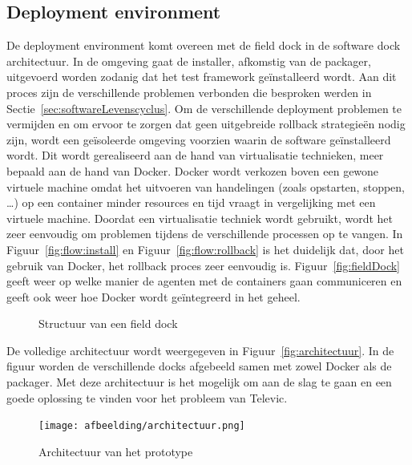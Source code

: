 \subsection{Deployment environment}
De deployment environment komt overeen met de field dock in de software dock architectuur.
In de omgeving gaat de installer, afkomstig van de packager, uitgevoerd worden zodanig dat het test framework geïnstalleerd wordt.
Aan dit proces zijn de verschillende problemen verbonden die besproken werden in Sectie~\vref{sec:softwareLevenscyclus}.
Om de verschillende deployment problemen te vermijden en om ervoor te zorgen dat geen uitgebreide rollback strategieën nodig zijn, wordt een geïsoleerde omgeving voorzien waarin de software geïnstalleerd wordt. 
Dit wordt gerealiseerd aan de hand van virtualisatie technieken, meer bepaald aan de hand van Docker.
Docker wordt verkozen boven een gewone virtuele machine omdat het uitvoeren van handelingen (zoals opstarten, stoppen, \ldots) op een container minder resources en tijd vraagt in vergelijking met een virtuele machine.
Doordat een virtualisatie techniek wordt gebruikt, wordt het zeer eenvoudig om problemen tijdens de verschillende processen op te vangen.
In Figuur~\vref{fig:flow:install} en Figuur~\vref{fig:flow:rollback} is het duidelijk dat, door het gebruik van Docker, het rollback proces zeer eenvoudig is.
Figuur~\vref{fig:fieldDock} geeft weer op welke manier de agenten met de containers gaan communiceren en geeft ook weer hoe Docker wordt geïntegreerd in het geheel.

\begin{figure}[!ht]
\centering
{}
\caption{Structuur van een field dock}
\label{fig:fieldDock}
\end{figure}

De volledige architectuur wordt weergegeven in Figuur~\vref{fig:architectuur}.
In de figuur worden de verschillende docks afgebeeld samen met zowel Docker als de packager.
Met deze architectuur is het mogelijk om aan de slag te gaan en een goede oplossing te vinden voor het probleem van Televic.

\begin{figure}
\texttt{[image: afbeelding/architectuur.png]}
\centering
\caption{Architectuur van het prototype}
\label{fig:architectuur}
\end{figure}
